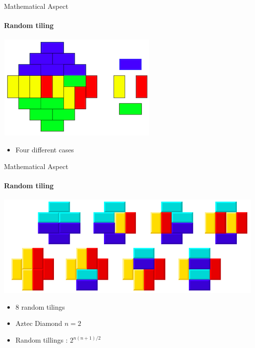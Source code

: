 \documentclass [xcolor=svgnames, t] {beamer}
\begin{document}
 \begin{frame}{Mathematical Aspect}
 \framesubtitle{Random tiling}
 \begin{itemize}
    \begin{center}
\includegraphics[scale=0.55]{Echec2.png}
\end{center}
 \end{itemize}
 \begin{itemize}
     \item Four different cases
      
     
 \end{itemize}

 
 \end{frame}
 
 \begin{frame}{Mathematical Aspect}
 \framesubtitle{Random tiling}
 \begin{itemize}
    \begin{center}
\includegraphics[scale=0.45]{Ti1.png}
\end{center}
 \end{itemize}
 \begin{itemize}
     \item 8 random tilings
      \item Aztec Diamond $n = 2$
        \item Random tillings : $2^{n(n+1)/2}$
     
 \end{itemize}

 
 \end{frame}
 
\end{document}
